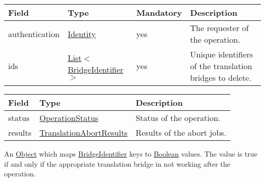 \documentclass[a4paper]{arrowhead}
\newcommand{\pref}[1]{{\textcolor{ArrowheadGrey}{\hyperref[sec:model:primitives:#1]{#1}}}}
\begin{document}
\begin{table}[ht!]
\begin{tabularx}{\textwidth}{| p{3.9cm} | p{5.0cm} | p{2cm} | X |} \hline
\rowcolor{gray!33} Field & Type & Mandatory & Description \\ \hline
authentication & \hyperref[sec:model:Identity]{Identity} & yes & The requester of the operation. \\ \hline
ids & \pref{List}$<$\pref{BridgeIdentifier}$>$ & yes & Unique identifiers of the translation bridges to delete. \\ \hline
\end{tabularx}
\end{table}


\begin{table}[ht!]
\begin{tabularx}{\textwidth}{| p{4.25cm} | p{5.5cm} | X |} \hline
\rowcolor{gray!33} Field & Type      & Description \\ \hline
status & \pref{OperationStatus} & Status of the operation. \\ \hline
results & \hyperref[sec:model:TranslationAbortResults]{TranslationAbortResults} & Results of the abort jobs. \\ \hline
\end{tabularx}
\end{table}


An \pref{Object} which maps \pref{BridgeIdentifier} keys to \pref{Boolean} values. The value is true if and only if the appropriate translation bridge in not working after the operation.

\end{document}
